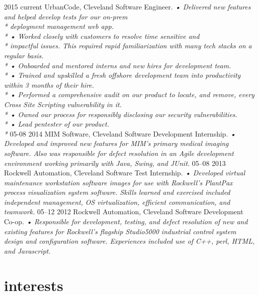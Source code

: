 \documentclass[]{friggeri-cv}
\begin{document}
\begin{entrylist}
  \entry
    {2015 current}
    {UrbanCode, Cleveland}
    {Software Engineer.}
    {\emph{
    •	Delivered new features and helped develop tests for our on-prem \\* deployment management web app.\\*
    •	Worked closely with customers to resolve time sensitive and \\* impactful issues. This required rapid familiarization with many tech stacks on a regular basis.\\*
    •	Onboarded and mentored interns and new hires for development team. \\*
    •	Trained and upskilled a fresh offshore development team into productivity within 3 months of their hire. \\*
    •	Performed a comprehensive audit on our product to locate, and remove, every Cross Site Scripting vulnerability in it.\\*
    •	Owned our process for responsibly disclosing our security vulnerabilities.\\*
    •	Lead pentester of our product.\\*
}}
  \entry
    {05-08 2014}
    {MIM Software, Cleveland}
    {Software Development Internship.}
    {\emph{
    •	Developed and improved new features for MIM's primary medical imaging software. Also was responsible for defect resolution in an Agile development environment working primarily with Java, Swing, and JUnit.}}
  \entry
    {05–08 2013}
    {Rockwell Automation, Cleveland}
    {Software Test Internship.}
    {\emph{
    •	Developed virtual maintenance workstation software images for use with Rockwell’s PlantPax process visualization system software. Skills learned and exercised included independent management, OS virtualization, efficient communication, and teamwork.}}
  \entry
    {05–12 2012}
    {Rockwell Automation, Cleveland}
    {Software Development Co-op.}
    {\emph{
    •	Responsible for development, testing, and defect resolution of new and existing features for Rockwell’s flagship Studio5000 industrial control system design and configuration software.  Experiences included use of C++, perl, HTML, and Javascript.}}
\end{entrylist}

\section{interests}
\end{document}

